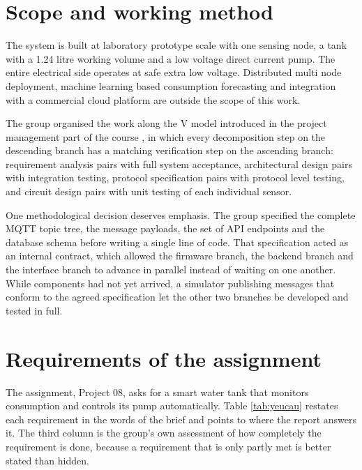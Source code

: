 \section{Scope and working method}
\label{sec:o1-2}

The system is built at laboratory prototype scale with one sensing node, a tank with a 1.24 litre working volume and a low voltage direct current pump. The entire electrical side operates at safe extra low voltage. Distributed multi node deployment, machine learning based consumption forecasting and integration with a commercial cloud platform are outside the scope of this work.

The group organised the work along the V model introduced in the project management part of the course \cite{slide01}, in which every decomposition step on the descending branch has a matching verification step on the ascending branch: requirement analysis pairs with full system acceptance, architectural design pairs with integration testing, protocol specification pairs with protocol level testing, and circuit design pairs with unit testing of each individual sensor.

One methodological decision deserves emphasis. The group specified the complete MQTT topic tree, the message payloads, the set of API endpoints and the database schema before writing a single line of code. That specification acted as an internal contract, which allowed the firmware branch, the backend branch and the interface branch to advance in parallel instead of waiting on one another. While components had not yet arrived, a simulator publishing messages that conform to the agreed specification let the other two branches be developed and tested in full.


\section{Requirements of the assignment}
\label{sec:o2-1}

The assignment, Project 08, asks for a smart water tank that monitors consumption and controls its pump automatically. Table \ref{tab:yeucau} restates each requirement in the words of the brief and points to where the report answers it. The third column is the group's own assessment of how completely the requirement is done, because a requirement that is only partly met is better stated than hidden.

